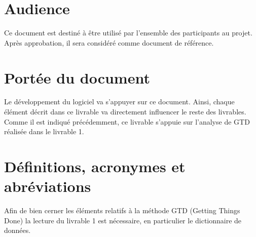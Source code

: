 	\section{Audience}
Ce document est destiné à être utilisé par l'ensemble des participants au projet. Après approbation, il sera considéré comme document de référence.
	
	\section{Portée du document}
Le développement du logiciel va s'appuyer sur ce document. Ainsi, chaque élément décrit dans ce livrable va directement influencer le reste des livrables. Comme il est indiqué précédemment, ce livrable s'appuie sur l'analyse de GTD réalisée dans le livrable 1.  

	\section{Définitions, acronymes et abréviations}
	Afin de bien cerner les éléments relatifs à la méthode GTD (Getting Things Done) la lecture du livrable 1 est nécessaire, en particulier le dictionnaire de données.
  

